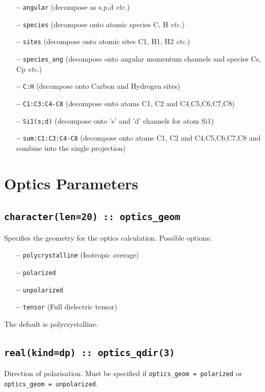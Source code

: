 \documentclass[a4paper,11pt,twoside]{book}
\begin{document}
{\begin{itemize}
\item[{\bf --}]  \verb#angular# (decompose as s,p,d \emph{etc.})
\item[{\bf --}]  \verb#species#    (decompose onto atomic species C, H \emph{etc.})
\item[{\bf --}]  \verb#sites#    (decompose onto atomic sites C1, H1, H2 \emph{etc.})
\item[{\bf --}]  \verb#species_ang#    (decompose onto angular momentum channels and species Cs, Cp \emph{etc.})
\item[{\bf --}]  \verb#C:H#     (decompose onto Carbon and Hydrogen sites)
\item[{\bf --}]  \verb#C1:C3:C4-C8#  (decompose onto atoms C1, C2 and C4,C5,C6,C7,C8)
\item[{\bf --}]  \verb#Si1(s;d)#     (decompose onto 's' and 'd' channels for
  atom Si1)
\item[{\bf --}]  \verb#sum:C1:C3:C4-C8#  (decompose onto atoms C1, C2 and C4,C5,C6,C7,C8 and combine into the single projection)

\end{itemize}

\section{Optics Parameters}

\subsection[optics\_geom]{\tt character(len=20) :: optics\_geom}

Specifies the geometry for the optics calculation.  Possible options:
\begin{itemize}
\item[{\bf --}]  \verb#polycrystalline# (Isotropic average)
\item[{\bf --}]  \verb#polarized#  
\item[{\bf --}]  \verb#unpolarized# 
\item[{\bf --}]  \verb#tensor# (Full dielectric tensor)
\end{itemize}
The default is polycrystalline.

\subsection[optics\_qdir]{\tt real(kind=dp) :: optics\_qdir(3)}
Direction of polarisation. Must be specified if \verb#optics_geom = polarized#  
or \verb#optics_geom = unpolarized#.

}
\end{document}
